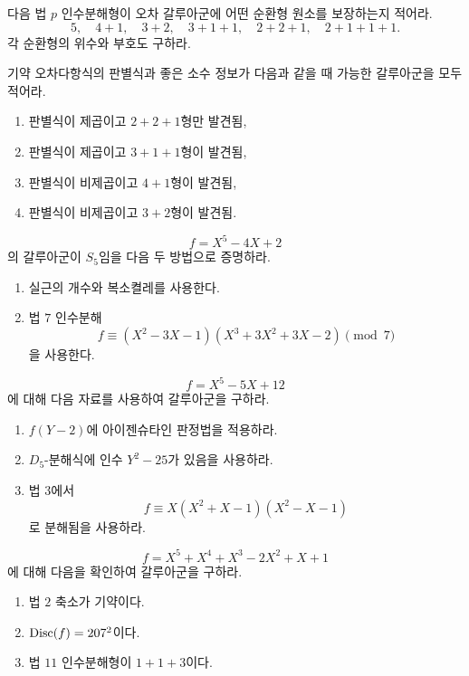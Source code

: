 \begin{exercise}[*]
다음 법 $p$ 인수분해형이 오차 갈루아군에 어떤 순환형 원소를 보장하는지 적어라.
\[
  5,\quad4+1,\quad3+2,\quad3+1+1,
  \quad2+2+1,\quad2+1+1+1.
\]
각 순환형의 위수와 부호도 구하라.
\end{exercise}

\begin{exercise}
기약 오차다항식의 판별식과 좋은 소수 정보가 다음과 같을 때 가능한 갈루아군을 모두 적어라.
\begin{enumerate}[label=(\alph*)]
  \item 판별식이 제곱이고 $2+2+1$형만 발견됨,
  \item 판별식이 제곱이고 $3+1+1$형이 발견됨,
  \item 판별식이 비제곱이고 $4+1$형이 발견됨,
  \item 판별식이 비제곱이고 $3+2$형이 발견됨.
\end{enumerate}
\end{exercise}

\begin{exercise}[*]
\[
  f=X^5-4X+2
\]
의 갈루아군이 $S_5$임을 다음 두 방법으로 증명하라.
\begin{enumerate}[label=(\alph*)]
  \item 실근의 개수와 복소켤레를 사용한다.
  \item 법 $7$ 인수분해
  \[
    f\equiv(X^2-3X-1)(X^3+3X^2+3X-2)\pmod7
  \]
  을 사용한다.
\end{enumerate}
\end{exercise}

\begin{exercise}[*]
\[
  f=X^5-5X+12
\]
에 대해 다음 자료를 사용하여 갈루아군을 구하라.
\begin{enumerate}[label=(\alph*)]
  \item $f(Y-2)$에 아이젠슈타인 판정법을 적용하라.
  \item $D_5$-분해식에 인수 $Y^2-25$가 있음을 사용하라.
  \item 법 $3$에서
  \[
    f\equiv X(X^2+X-1)(X^2-X-1)
  \]
  로 분해됨을 사용하라.
\end{enumerate}
\end{exercise}

\begin{exercise}[*]
\[
  f=X^5+X^4+X^3-2X^2+X+1
\]
에 대해 다음을 확인하여 갈루아군을 구하라.
\begin{enumerate}[label=(\alph*)]
  \item 법 $2$ 축소가 기약이다.
  \item $\operatorname{Disc}(f)=207^2$이다.
  \item 법 $11$ 인수분해형이 $1+1+3$이다.
\end{enumerate}
\end{exercise}

